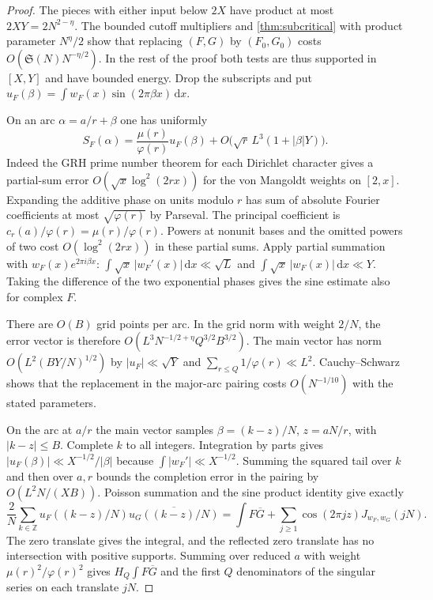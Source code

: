\documentclass[11pt,a4paper]{article}
\numberwithin{equation}{section}
\newcommand{\SSS}{\mathfrak S}
\newcommand{\ud}{\mathrm d}
\begin{document}
\begin{proof}
The pieces with either input below $2X$ have product at most
$2XY=2N^{2-\eta}$. The bounded cutoff multipliers and
\cref{thm:subcritical} with product parameter $N^\eta/2$ show
that replacing $(F,G)$ by $(F_0,G_0)$ costs
$O(\SSS(N)N^{-\eta/2})$. In the rest of the proof both tests
are thus supported in $[X,Y]$ and have bounded energy. Drop
the subscripts and put
$u_F(\beta)=\int w_F(x)\sin(2\pi\beta x)\,\ud x$.

On an arc $\alpha=a/r+\beta$ one has uniformly
\[
 S_F(\alpha)=\frac{\mu(r)}{\varphi(r)}u_F(\beta)
        +O\big(\sqrt r\,L^3(1+|\beta|Y)\big).
\]
Indeed the GRH prime number theorem for each Dirichlet character
gives a partial-sum error $O(\sqrt x\log^2(2rx))$ for the von
Mangoldt weights on $[2,x]$. Expanding the additive phase on
units modulo $r$ has sum of absolute Fourier coefficients at most
$\sqrt{\varphi(r)}$ by Parseval. The principal coefficient is
$c_r(a)/\varphi(r)=\mu(r)/\varphi(r)$. Powers at nonunit bases
and the omitted powers of two cost $O(\log^2(2rx))$ in these
partial sums. Apply partial summation with $w_F(x)e^{2\pi i\beta x}$:
$\int\sqrt x\,|w_F'(x)|\,\ud x\ll\sqrt L$ and
$\int\sqrt x\,|w_F(x)|\,\ud x\ll Y$. Taking the difference of
the two exponential phases gives the sine estimate also for
complex $F$.

There are $O(B)$ grid points per arc. In the grid norm with weight
$2/N$, the error vector is therefore
$O(L^3 N^{-1/2+\eta} Q^{3/2}B^{3/2})$.
The main vector has norm $O(L^2(BY/N)^{1/2})$ by
$|u_F|\ll\sqrt Y$ and $\sum_{r\le Q}1/\varphi(r)\ll L^2$.
Cauchy--Schwarz shows that the replacement in the major-arc
pairing costs $O(N^{-1/10})$ with the stated parameters.

On the arc at $a/r$ the main vector samples $\beta=(k-z)/N$,
$z=aN/r$, with $|k-z|\le B$. Complete $k$ to all integers.
Integration by parts gives
$|u_F(\beta)|\ll X^{-1/2}/|\beta|$ because
$\int |w_F'|\ll X^{-1/2}$. Summing the squared tail over
$k$ and then over $a,r$ bounds the completion error in the
pairing by $O(L^2N/(XB))$. Poisson summation and the sine product
identity give exactly
\[
 \frac2N\sum_{k\in\mathbb Z}u_F((k-z)/N)
                     \overline{u_G((k-z)/N)}
 =\int F\overline G+
       \sum_{j\ge1}\cos(2\pi jz)J_{w_F,w_G}(jN).
\]
The zero translate gives the integral, and the reflected zero
translate has no intersection with positive supports. Summing
over reduced $a$ with weight $\mu(r)^2/\varphi(r)^2$ gives
$H_Q\int F\overline G$ and the first $Q$ denominators of the
singular series on each translate $jN$.


\end{proof}
\end{document}
